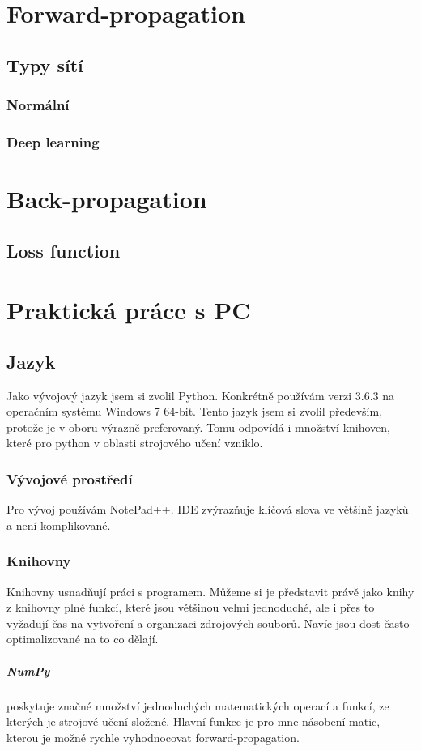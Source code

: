 \documentclass[12pt,a4paper]{report}
\begin{document}
\chapter{Forward-propagation}
	\section{Typy sítí}
		\subsection{Normální}
		\subsection{Deep learning}	
\chapter{Back-propagation}
	\section{Loss function}
		
\chapter{Praktická práce s PC}
	\section{Jazyk}
	Jako vývojový jazyk jsem si zvolil Python. Konkrétně používám verzi 3.6.3 na operačním systému Windows 7 64-bit. Tento jazyk jsem si zvolil především, protože je v oboru výrazně preferovaný. Tomu odpovídá i množství knihoven, které pro python v oblasti strojového učení vzniklo. 
		\subsection{Vývojové prostředí}
		Pro vývoj používám NotePad++. IDE zvýrazňuje klíčová slova ve většině jazyků a není komplikované.
		\subsection{Knihovny}
		Knihovny usnadňují práci s programem. Můžeme si je představit právě jako knihy z knihovny plné funkcí, které jsou většinou velmi jednoduché, ale i přes to vyžadují čas na vytvoření a organizaci zdrojových souborů. Navíc jsou dost často optimalizované na to co dělají.
			\paragraph{NumPy}
			poskytuje značné množství jednoduchých matematických operací a funkcí, ze kterých je strojové učení složené. Hlavní funkce je pro mne násobení matic, kterou je možné rychle vyhodnocovat forward-propagation.
\end{document}
